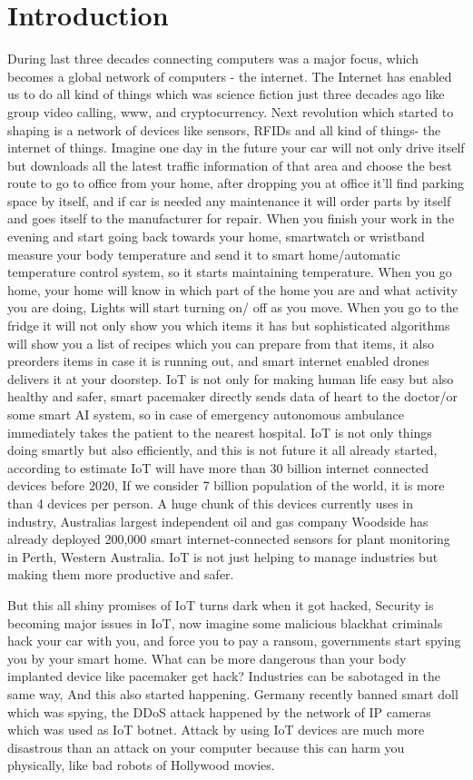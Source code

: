 \documentclass[preprint,12pt,5p]{elsarticle}
\begin{document}
\section{Introduction}
During last three decades connecting computers was a major focus, which becomes a global network of computers - the internet. The Internet has enabled us to do all kind of things which was science fiction just three decades ago like group video calling, www, and cryptocurrency. 
Next revolution which started to shaping is a network of devices like sensors,  RFIDs and all kind of things- the internet of things. 
Imagine one day in the future your car will not only drive itself but downloads all the latest traffic information of that area and choose the best route to go to office from your home, after dropping you at office it'll find parking space by itself, and if car is needed any maintenance it will order parts by itself and goes itself to the manufacturer for repair. When you finish your work in the evening and start going back towards your home, smartwatch or wristband measure your body temperature and send it to smart home/automatic temperature control system, so it starts maintaining temperature. When you go home, your home will know in which part of the home you are and what activity you are doing, Lights will start turning on/ off as you move. When you go to the fridge it will not only show you which items it has but sophisticated algorithms will show you a list of recipes which you can prepare from that items, it also preorders items in case it is running out, and smart internet enabled drones delivers it at your doorstep. IoT is not only for making human life easy but also healthy and safer, smart pacemaker directly sends data of heart to the doctor/or some smart AI system, so in case of emergency autonomous ambulance immediately takes the patient to the nearest hospital. IoT is not only things doing smartly but also efficiently, and this is not future it all already started, according to estimate IoT will have more than 30 billion internet connected devices before 2020, If we consider 7 billion population of the world, it is more than 4 devices per person. A huge chunk of this devices currently uses in industry, Australias largest independent oil and gas company Woodside has already deployed 200,000 smart internet-connected sensors for plant monitoring in Perth, Western Australia. IoT is not just helping to manage industries but making them more productive and safer.\cite{Bloede2015}

But this all shiny promises of IoT turns dark when it got hacked, Security is becoming major issues in IoT, now imagine some malicious blackhat criminals hack your car with you, and force you to pay a ransom, governments start spying you by your smart home. What can be more dangerous than your body implanted device like pacemaker get hack? Industries can be sabotaged in the same way, And this also started happening. Germany recently banned smart doll which was spying, the DDoS attack happened by the network of IP cameras which was used as IoT botnet. Attack by using IoT devices are much more disastrous than an attack on your computer because this can harm you physically, like bad robots of Hollywood movies.
\end{document}
